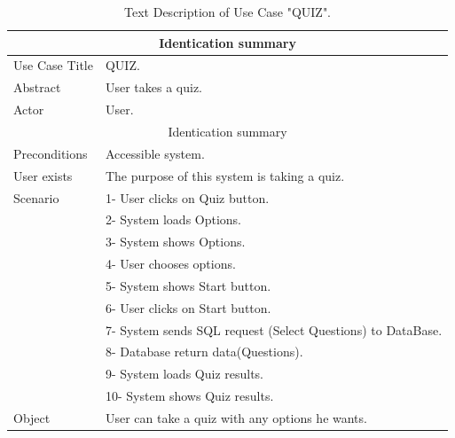 \begin{table}[h!]
	\begin{center}
		\begin{tabular}{ |p{3cm}|p{9cm}|  }
			\hline
			\multicolumn{2}{|c|}{Identication summary} \\
			\hline
			Use Case Title & QUIZ. \\
			\hline
			Abstract   & User takes a quiz. \\
		   \hline
			Actor&  User. \\
		   \hline
		   \multicolumn{2}{|c|}{Identication summary} \\
		   \hline
		   Preconditions & Accessible system.  \\
		   \hline
		   User exists    &  The purpose of this system is taking a quiz. \\
		   \hline
		   Scenario &  1- User clicks on Quiz button. \\ & 2- System loads Options. \\ & 3- System shows Options. \\ & 4- User chooses options. \\ & 5- System shows Start button. \\ & 6- User clicks on Start button. \\ & 7- System sends SQL request (Select Questions) to DataBase. \\ & 8- Database return data(Questions).\\ & 9- System loads Quiz results.\\ & 10- System shows Quiz results.\\
		   \hline
		   Object&  User can take a quiz with any options he wants.  \\
			\hline
\end{tabular}
\end{center}
\caption{Text Description of Use Case "QUIZ".}
\label{tab:DS QUIZ}
\end{table}



